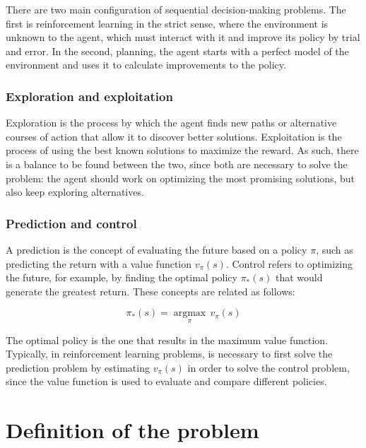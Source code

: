 There are two main configuration of sequential decision-making problems. The first is reinforcement learning in the strict sense, where the environment is unknown to the agent, which must interact with it and improve its policy by trial and error. In the second, planning, the agent starts with a perfect model of the environment and uses it to calculate improvements to the policy.


\subsubsection*{Exploration and exploitation}

Exploration is the process by which the agent finds new paths or alternative courses of action that allow it to discover better solutions. Exploitation is the process of using the best known solutions to maximize the reward. As such, there is a balance to be found between the two, since both are necessary to solve the problem: the agent should work on optimizing the most promising solutions, but also keep exploring alternatives.

\subsubsection*{Prediction and control}

A prediction is the concept of evaluating the future based on a policy $\pi$, such as predicting the return with a value function $v_\pi(s)$. Control refers to optimizing the future, for example, by finding the optimal policy $\pi_\ast(s)$ that would generate the greatest return. These concepts are related as follows:

\begin{equation}
    \pi_\ast(s) = \underset{\pi}{\operatorname{argmax}}\,v_\pi(s)
\end{equation}

The optimal policy is the one that results in the maximum value function. Typically, in reinforcement learning problems, is necessary to first solve the prediction problem by estimating $v_\pi(s)$ in order to solve the control problem, since the value function is used to evaluate and compare different policies.

\section{Definition of the problem}

